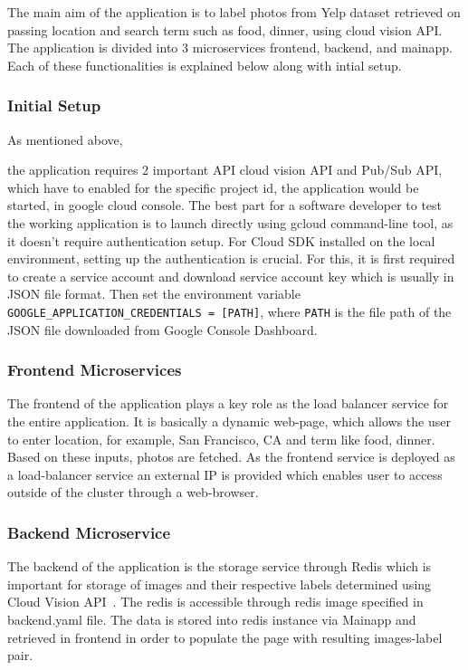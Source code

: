 The main aim of the application is to label photos from Yelp dataset
retrieved on passing location and search term such as food, dinner,
using cloud vision API. The application is divided into 3
microservices frontend, backend, and mainapp. Each of these
functionalities is explained below along with intial setup.

\subsubsection{Initial Setup} 

As mentioned above, 


the application requires 2 important API cloud
vision API and Pub/Sub API, which have to enabled for the specific
project id, the application would be started, in google cloud
console. The best part for a software developer to test the working
application is to launch directly using gcloud command-line tool, as
it doesn’t require authentication setup.  For Cloud SDK installed on
the local environment, setting up the authentication is crucial. For
this, it is first required to create a service account and download
service account key which is usually in JSON file format. Then set the
environment variable \verb|GOOGLE_APPLICATION_CREDENTIALS = [PATH]|,
where \verb|PATH| is the file path of the JSON file downloaded from Google
Console Dashboard.

\subsubsection{Frontend Microservices} 

The frontend of the application plays a key role as the load balancer
service for the entire application. It is basically a dynamic
web-page, which allows the user to enter location, for example, San
Francisco, CA and term like food, dinner. Based on these inputs,
photos are fetched. As the frontend service is deployed as a
load-balancer service an external IP is provided which enables user to
access outside of the cluster through a web-browser.

\subsubsection{Backend Microservice} 

The backend of the application is the storage service through Redis
which is important for storage of images and their respective labels
determined using Cloud Vision API~\cite{hid-sp18-602-redis}. The redis
is accessible through redis image specified in backend.yaml file. The
data is stored into redis instance via Mainapp and retrieved in
frontend in order to populate the page with resulting images-label
pair.


